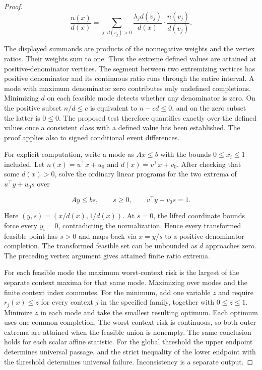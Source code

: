 \begin{proof}
\[
\frac{n(x)}{d(x)}
=\sum_{j:\,d(v_j)>0}\frac{\lambda_j d(v_j)}{d(x)}
\cdot\frac{n(v_j)}{d(v_j)}.
\]

The displayed summands are products of the nonnegative weights and the vertex ratios. Their weights sum to one. Thus the extreme defined values are attained at positive-denominator vertices. The segment between two extremizing vertices has positive denominator and its continuous ratio runs through the entire interval. A mode with maximum denominator zero contributes only undefined completions. Minimizing \(d\) on each feasible mode detects whether any denominator is zero. On the positive subset \(n/d\le c\) is equivalent to \(n-cd\le0\), and on the zero subset the latter is \(0\le0\). The proposed test therefore quantifies exactly over the defined values once a consistent class with a defined value has been established. The proof applies also to signed conditional event differences.

For explicit computation, write a mode as \(A x\le b\) with the bounds \(0\le x_i\le1\) included. Let \(n(x)=u^\top x+u_0\) and \(d(x)=v^\top x+v_0\). After checking that some \(d(x)>0\), solve the ordinary linear programs for the two extrema of \(u^\top y+u_0 s\) over

\[
A y\le bs,\qquad s\ge0,\qquad v^\top y+v_0s=1.
\]

Here \((y,s)=(x/d(x),1/d(x))\). At \(s=0\), the lifted coordinate bounds force every \(y_i=0\), contradicting the normalization. Hence every transformed feasible point has \(s>0\) and maps back via \(x=y/s\) to a positive-denominator completion. The transformed feasible set can be unbounded as \(d\) approaches zero. The preceding vertex argument gives attained finite ratio extrema.

For each feasible mode the maximum worst-context risk is the largest of the separate context maxima for that same mode. Maximizing over modes and the finite context index commutes. For the minimum, add one variable \(z\) and require \(r_j(x)\le z\) for every context \(j\) in the specified family, together with \(0\le z\le1\). Minimize \(z\) in each mode and take the smallest resulting optimum. Each optimum uses one common completion. The worst-context risk is continuous, so both outer extrema are attained when the feasible union is nonempty. The same conclusion holds for each scalar affine statistic. For the global threshold the upper endpoint determines universal passage, and the strict inequality of the lower endpoint with the threshold determines universal failure. Inconsistency is a separate output.


\end{proof}
